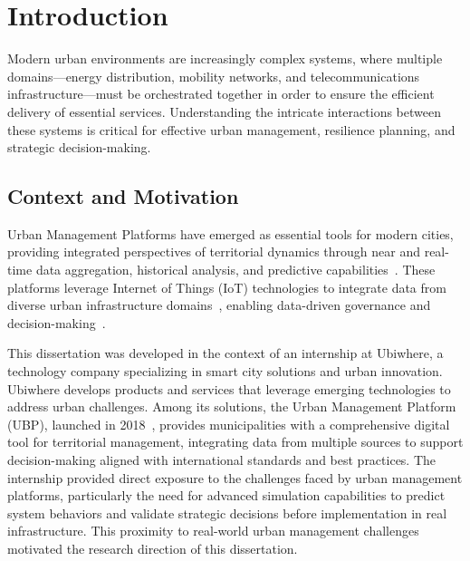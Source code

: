 \chapter{Introduction}%
\label{chapter:introduction}

\begin{introduction}
Modern urban environments are increasingly complex systems, where multiple domains—energy distribution, mobility networks, and telecommunications infrastructure—must be orchestrated together in order to ensure the efficient delivery of essential services. Understanding the intricate interactions between these systems is critical for effective urban management, resilience planning, and strategic decision-making.
\end{introduction}


\section{Context and Motivation}

Urban Management Platforms have emerged as essential tools for modern cities, providing integrated perspectives of territorial dynamics through near and real-time data aggregation, historical analysis, and predictive capabilities~\cite{smart_city_platforms}. These platforms leverage Internet of Things (IoT) technologies to integrate data from diverse urban infrastructure domains~\cite{urban_platform_iot}, enabling data-driven governance and decision-making~\cite{urban_data_platforms}. 

This dissertation was developed in the context of an internship at Ubiwhere, a technology company specializing in smart city solutions and urban innovation. Ubiwhere develops products and services that leverage emerging technologies to address urban challenges. Among its solutions, the Urban Management Platform (UBP), launched in 2018~\cite{ubiwhere_urban_platform}, provides municipalities with a comprehensive digital tool for territorial management, integrating data from multiple sources to support decision-making aligned with international standards and best practices. The internship provided direct exposure to the challenges faced by urban management platforms, particularly the need for advanced simulation capabilities to predict system behaviors and validate strategic decisions before implementation in real infrastructure. This proximity to real-world urban management challenges motivated the research direction of this dissertation.

